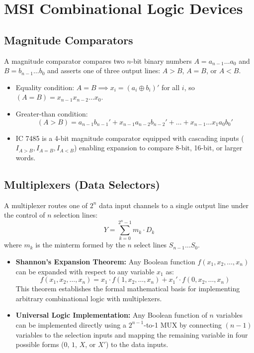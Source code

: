 \documentclass[12pt,a4paper]{article}
\begin{document}
\section{MSI Combinational Logic Devices}

\subsection{Magnitude Comparators}
A magnitude comparator compares two $n$-bit binary numbers $A = a_{n-1} \dots a_0$ and $B = b_{n-1} \dots b_0$ and asserts one of three output lines: $A > B$, $A = B$, or $A < B$.
\begin{itemize}[leftmargin=*, itemsep=3pt]
  \item Equality condition: $A = B \implies x_i = (a_i \oplus b_i)'$ for all $i$, so $(A=B) = x_{n-1} x_{n-2} \dots x_0$.
  \item Greater-than condition:
  \begin{equation}
    (A > B) = a_{n-1} b_{n-1}' + x_{n-1} a_{n-2} b_{n-2}' + \dots + x_{n-1} \dots x_1 a_0 b_0'
  \end{equation}
  \item IC 7485 is a 4-bit magnitude comparator equipped with cascading inputs ($I_{A>B}, I_{A=B}, I_{A<B}$) enabling expansion to compare 8-bit, 16-bit, or larger words.
\end{itemize}

\subsection{Multiplexers (Data Selectors)}
A multiplexer routes one of $2^n$ data input channels to a single output line under the control of $n$ selection lines:
\begin{equation}
  Y = \sum_{k=0}^{2^n-1} m_k \cdot D_k
\end{equation}
where $m_k$ is the minterm formed by the $n$ select lines $S_{n-1} \dots S_0$.
\begin{itemize}[leftmargin=*, itemsep=3pt]
  \item \textbf{Shannon's Expansion Theorem:} Any Boolean function $f(x_1, x_2, \dots, x_n)$ can be expanded with respect to any variable $x_1$ as:
  \begin{equation}
    f(x_1, x_2, \dots, x_n) = x_1 \cdot f(1, x_2, \dots, x_n) + x_1' \cdot f(0, x_2, \dots, x_n)
  \end{equation}
  This theorem establishes the formal mathematical basis for implementing arbitrary combinational logic with multiplexers.
  \item \textbf{Universal Logic Implementation:} Any Boolean function of $n$ variables can be implemented directly using a $2^{n-1}$-to-1 MUX by connecting $(n-1)$ variables to the selection inputs and mapping the remaining variable in four possible forms ($0$, $1$, $X$, or $X'$) to the data inputs.
\end{itemize}
\end{document}

